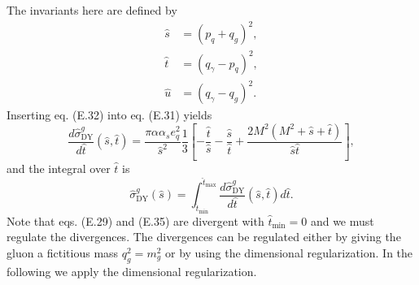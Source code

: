 The invariants here are defined by
\begin{align}
\hat{s}&=(p_q+q_{g})^2,\nonumber\\
\hat{t}&=(q_\gamma-p_{q})^2,\nonumber\\
\hat{u}&=(q_\gamma-q_{g})^2.
\end{align}
Inserting eq. (E.32) into eq. (E.31) yields
\begin{equation}
\frac{d\hat{\sigma}^g_\text{DY}}{d\hat{t}}(\hat{s},\hat{t})=\frac{\pi\alpha\alpha_s e^2_q}{\hat{s}^2}\frac{1}{3}\left[ -\frac{\hat{t}}{\hat{s}}-\frac{\hat{s}}{\hat{t}}+\frac{2M^2(M^2+\hat{s}+\hat{t})}{\hat{s}\hat{t}} \right],
\end{equation} 
and the integral over $\hat{t}$ is 
\begin{equation}
\hat{\sigma}^g_\text{DY}(\hat{s})=\int_{\hat{t}_\text{min}}^{\hat{t}_\text{max}}\frac{d\hat{\sigma}^g_\text{DY}}{d\hat{t}}(\hat{s},\hat{t})d\hat{t}.
\end{equation}
Note that eqs. (E.29) and (E.35) are divergent with $\hat{t}_\text{min}=0$ and we must regulate the divergences. The divergences can be regulated either by giving the gluon a fictitious mass $q^2_g=m^2_g$ or by using the dimensional regularization. In the following we apply the dimensional regularization. 

